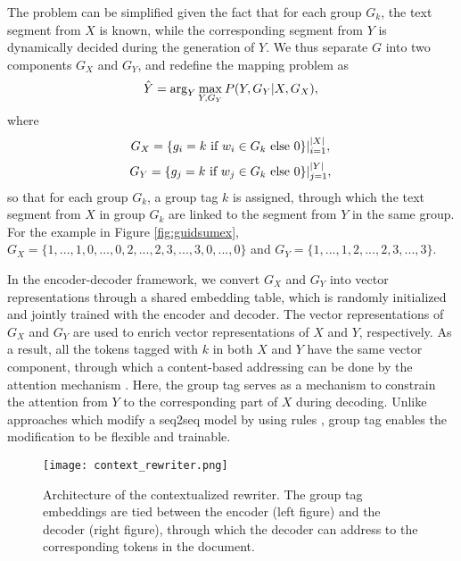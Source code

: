 \documentclass[letterpaper]{article} %
\begin{document}
The problem can be simplified given the fact that for each group $G_k$, the text segment from $X$ is known, while the corresponding segment from $Y$ is dynamically decided during the generation of $Y$. We thus separate $G$ into two components $G_X$ and $G_Y$, and redefine the mapping problem as
\begin{equation}
  \hat{Y} = \arg_Y \max_{Y,G_Y} P(Y,G_Y|X, G_X),  \\
\label{eq:seq2seq:def2}
\end{equation}
where
\begin{equation}
  G_X = \{g_i= k \text{ if } w_i \in G_k \text{ else } 0 \}|_{i=1}^{|X|}, \\
\label{eq:seq2seq:gx}
\end{equation}
\begin{equation}
  G_Y = \{g_j= k \text{ if } w_j \in G_k \text{ else } 0 \}|_{j=1}^{|Y|}, \\
\label{eq:seq2seq:gy}
\end{equation}
so that for each group $G_k$, a group tag $k$ is assigned, through which the text segment from $X$ in group $G_k$ are linked to the segment from $Y$ in the same group. For the example in Figure \ref{fig:guidsumex}, $G_X=\{1,...,1,0,...,0,2,...,2,3,...,3,0,...,0\}$ and $G_Y=\{1,...,1,2,...,2,3,...,3\}$.

In the encoder-decoder framework, we convert $G_X$ and $G_Y$ into vector representations through a shared embedding table, which is randomly initialized and jointly trained with the encoder and decoder. The vector representations of $G_X$ and $G_Y$ are used to enrich vector representations of $X$ and $Y$, respectively. As a result, all the tokens tagged with $k$ in both $X$ and $Y$ have the same vector component, through which a content-based addressing can be done by the attention mechanism \cite{garg2019}. Here, the group tag serves as a mechanism to constrain the attention from $Y$ to the corresponding part of $X$ during decoding. Unlike approaches which modify a seq2seq model by using rules \cite{Hsu2018, Gehrmann2019}, group tag enables the modification to be flexible and trainable.

\begin{figure*}[t]
    \centering\small
    \texttt{[image: context\_rewriter.png]}
    \caption{Architecture of the contextualized rewriter. The group tag embeddings are tied between the encoder (left figure) and the decoder (right figure), through which the decoder can address to the corresponding tokens in the document. }
    \label{fig:guidabs}
\end{figure*}
\end{document}
